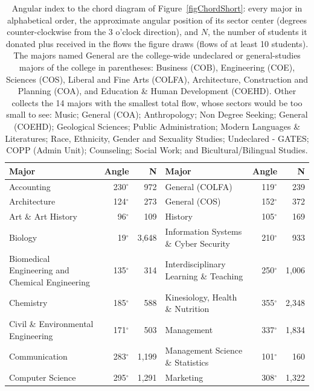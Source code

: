 \begin{table}[hbp]
  \centering
  \footnotesize
  \setlength{\tabcolsep}{4pt}
  \caption{Angular index to the chord diagram of Figure~\ref{figChordShort}: every major in alphabetical order, the approximate angular position of its sector center (degrees counter-clockwise from the 3 o'clock direction), and $N$, the number of students it donated plus received in the flows the figure draws (flows of at least 10 students). The majors named General are the college-wide undeclared or general-studies majors of the college in parentheses: Business (COB), Engineering (COE), Sciences (COS), Liberal and Fine Arts (COLFA), Architecture, Construction and Planning (COA), and Education \& Human Development (COEHD). Other collects the 14 majors with the smallest total flow, whose sectors would be too small to see: Music; General (COA); Anthropology; Non Degree Seeking; General (COEHD); Geological Sciences; Public Administration; Modern Languages \& Literatures; Race, Ethnicity, Gender and Sexuality Studies; Undeclared - GATES; COPP (Admin Unit); Counseling; Social Work; and Bicultural/\allowbreak{}Bilingual Studies.}
  \label{tab:majorangles}
  \begin{tabular}{>{\raggedright\arraybackslash}p{5.0cm}rr@{\quad}>{\raggedright\arraybackslash}p{5.0cm}rr}
    \toprule
    \textbf{Major} & \textbf{Angle} & \textbf{N} & \textbf{Major} & \textbf{Angle} & \textbf{N} \\
    \midrule
    Accounting & 230$^\circ$ & 972 & General (COLFA) & 119$^\circ$ & 239 \\
    Architecture & 124$^\circ$ & 273 & General (COS) & 152$^\circ$ & 372 \\
    Art \& Art History & 96$^\circ$ & 109 & History & 105$^\circ$ & 169 \\
    Biology & 19$^\circ$ & 3,648 & Information Systems \& Cyber Security & 210$^\circ$ & 933 \\
    Biomedical Engineering and Chemical Engineering & 135$^\circ$ & 314 & Interdisciplinary Learning \& Teaching & 250$^\circ$ & 1,006 \\
    Chemistry & 185$^\circ$ & 588 & Kinesiology, Health \& Nutrition & 355$^\circ$ & 2,348 \\
    Civil \& Environmental Engineering & 171$^\circ$ & 503 & Management & 337$^\circ$ & 1,834 \\
    Communication & 283$^\circ$ & 1,199 & Management Science \& Statistics & 101$^\circ$ & 160 \\
    Computer Science & 295$^\circ$ & 1,291 & Marketing & 308$^\circ$ & 1,322 \\

\end{tabular}
\end{table}
